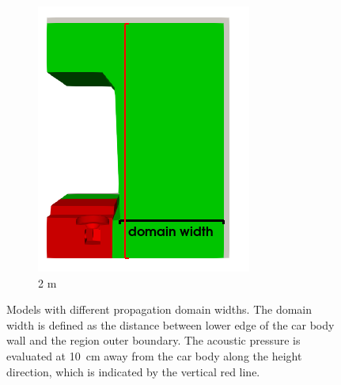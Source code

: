 \begin{figure}
\begin{subfigure}[b]{0.45\textwidth}
		\includegraphics[width=\linewidth]{fig/chap4/simulation_domain/2m.png}
		\caption{2 m}
		\label{fig:domain_width_2m}
	\end{subfigure}
	\caption{Models with different propagation domain widths. The domain width is defined as the distance between lower edge of the car body wall and the region outer boundary. The acoustic pressure is evaluated at \SI{10}{\centi\meter} away from the car body along the height direction, which is indicated by the vertical red line.}
	\label{fig:domain_size_variation}
\end{figure}

